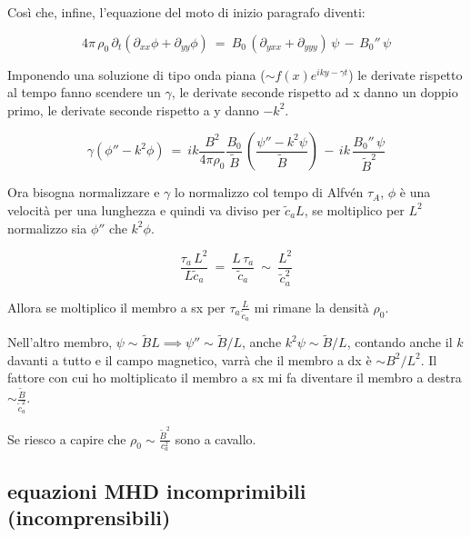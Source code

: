 Così che, infine, l'equazione del moto di inizio paragrafo diventi:

\[4\pi\,\rho_0\,\partial_t(\partial_{xx}\phi+\partial_{yy}\phi)\ =\ B_0\,(\partial_{yxx}+\partial_{yyy})\,\psi\,-\,B_0''\,\psi\]

Imponendo una soluzione di tipo onda piana ($\sim f(x)e^{iky-\gamma t}$) le derivate rispetto al tempo fanno scendere un $\gamma$, le derivate seconde rispetto ad x danno un doppio primo, le derivate seconde rispetto a y danno $-k^2$.  

\[\gamma (\phi '' - k^2 \phi)\ =\ i k \frac{B^2}{4\pi \rho_0} \frac{B_0}{\tilde B} \,\left(\frac{\psi '' - k^2 \psi}{\tilde B} \right)\, - \, ik\, \frac{B_0 ''\, \psi}{\tilde B^2}\]

Ora bisogna normalizzare e $\gamma$ lo normalizzo col tempo di Alfvén $\tau_A$, $\phi $ è una velocità  per una lunghezza e quindi va diviso per $\tilde c_aL$, se moltiplico per $L^2$ normalizzo sia $\phi ''$ che $k^2\phi$. 

\[\frac{\tau_a\, L^2}{L\tilde c_a}\ =\ \frac{L\, \tau_a}{\tilde c_a }\ \sim\ \frac{L^2}{\tilde c_a^2}\]

Allora se moltiplico il membro a sx per $\tau_a\frac{L}{\tilde c_a}$ mi rimane la densità $\rho_0$. 

Nell'altro membro, $\psi\sim \tilde BL\implies \psi''\sim \tilde B/L$, anche $k^2\psi\sim \tilde B/L$, contando anche il $k$ davanti a tutto e il campo magnetico, varrà che il membro a dx è $\sim B^2/L^2$. 
Il fattore con cui ho moltiplicato il membro a sx mi fa diventare il membro a destra $\sim \frac{\tilde B}{\tilde c_a^2}$.

Se riesco a capire che $\rho_0\sim\frac{\tilde B^2}{c_a^2}$ sono a cavallo. 


%
%
\subsection{equazioni MHD incomprimibili (incomprensibili)}
 
